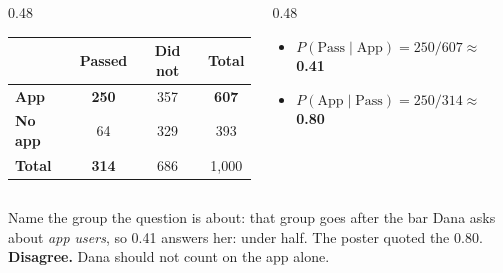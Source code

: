 \documentclass[aspectratio=169, 11pt]{beamer}
\newcommand{\redink}[1]{{\color{redacc}\bfseries #1}}
\begin{document}
\begin{frame}[t, plain]
  \begin{columns}[t]
    \begin{column}{0.48\textwidth}
      \begin{center}
      \renewcommand{\arraystretch}{1.3}
      \begin{tabular}{l c c c}
      \hline
       & \textbf{Passed} & \textbf{Did not} & \textbf{Total} \\
      \hline
      \textbf{App} & \textbf{250} & 357 & \textbf{607} \\
      \textbf{No app} & 64 & 329 & 393 \\
      \textbf{Total} & \textbf{314} & 686 & 1,000 \\
      \hline
      \end{tabular}
      \end{center}
    \end{column}
    \begin{column}{0.48\textwidth}
      \begin{itemize}\setlength{\itemsep}{5pt}
        \item $P(\text{Pass} \mid \text{App}) = 250/607 \approx$ \redink{0.41}
        \item $P(\text{App} \mid \text{Pass}) = 250/314 \approx$ \redink{0.80}
      \end{itemize}
    \end{column}
  \end{columns}
  \begin{block}{Name the group the question is about: that group goes after the bar}
    Dana asks about \emph{app users}, so 0.41 answers her: under half. The poster quoted the 0.80.
    \redink{Disagree.} Dana should not count on the app alone.
  \end{block}
\end{frame}
\end{document}
